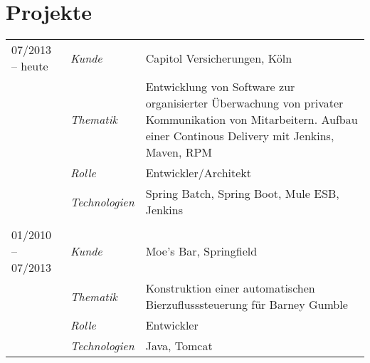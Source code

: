 \section*{Projekte}
\renewcommand{\arraystretch}{1.3}
\begin{longtable}{@{}>{}p{4cm}>{\itshape}p{2cm}>{}p{9cm}}
07/2013 -- heute	& Kunde 	& Capitol Versicherungen, Köln\\
\nopagebreak		& Thematik	& Entwicklung von Software zur organisierter Überwachung von privater Kommunikation von Mitarbeitern. Aufbau einer Continous Delivery mit Jenkins, Maven, RPM\\
\nopagebreak		& Rolle 	& Entwickler/Architekt\\
\nopagebreak		& Technologien	& Spring Batch, Spring Boot, Mule ESB, Jenkins\\
\\
01/2010 -- 07/2013	& Kunde 	& Moe's Bar, Springfield\\
\nopagebreak		& Thematik	& Konstruktion einer automatischen Bierzuflusssteuerung für Barney Gumble\\
\nopagebreak		& Rolle 	& Entwickler\\
\nopagebreak		& Technologien	& Java, Tomcat\\
\end{longtable}
\renewcommand{\arraystretch}{2}
